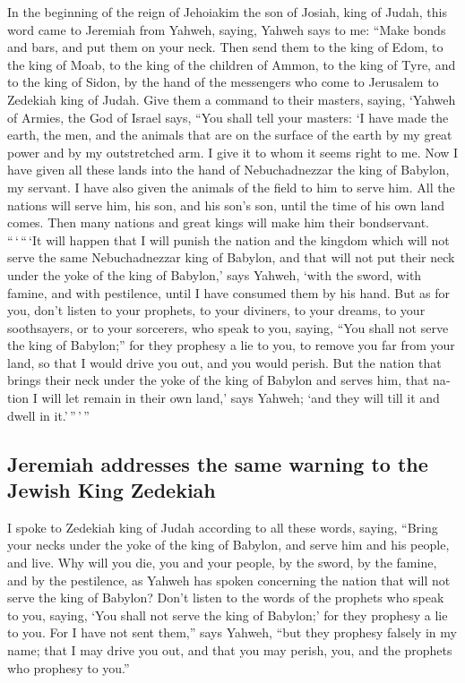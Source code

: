\begin{paracol}{2}
\begin{otherlanguage}{english}
 In the beginning of the reign of Jehoiakim the son of
Josiah, king of Judah, this word came to Jeremiah from Yahweh, saying,
 Yahweh says to me: ``Make bonds and bars, and put them on
your neck.  Then send them to the king of Edom, to the
king of Moab, to the king of the children of Ammon, to the king of Tyre,
and to the king of Sidon, by the hand of the messengers who come to
Jerusalem to Zedekiah king of Judah.  Give them a command
to their masters, saying, `Yahweh of Armies, the God of Israel says,
``You shall tell your masters:  `I have made the earth,
the men, and the animals that are on the surface of the earth by my
great power and by my outstretched arm. I give it to whom it seems right
to me.  Now I have given all these lands into the hand of
Nebuchadnezzar the king of Babylon, my servant. I have also given the
animals of the field to him to serve him.  All the nations
will serve him, his son, and his son's son, until the time of his own
land comes. Then many nations and great kings will make him their
bondservant.  ``\,`\,``\,`It will happen that I will
punish the nation and the kingdom which will not serve the same
Nebuchadnezzar king of Babylon, and that will not put their neck under
the yoke of the king of Babylon,' says Yahweh, `with the sword, with
famine, and with pestilence, until I have consumed them by his hand.
 But as for you, don't listen to your prophets, to your
diviners, to your dreams, to your soothsayers, or to your sorcerers, who
speak to you, saying, ``You shall not serve the king of Babylon;''
 for they prophesy a lie to you, to remove you far from
your land, so that I would drive you out, and you would perish.
 But the nation that brings their neck under the yoke of
the king of Babylon and serves him, that nation I will let remain in
their own land,' says Yahweh; `and they will till it and dwell in
it.'\,''\,'\,''

\hypertarget{jeremiah-addresses-the-same-warning-to-the-jewish-king-zedekiah}{%
\subsection{Jeremiah addresses the same warning to the Jewish King
Zedekiah}\label{jeremiah-addresses-the-same-warning-to-the-jewish-king-zedekiah}}

 I spoke to Zedekiah king of Judah according to all these
words, saying, ``Bring your necks under the yoke of the king of Babylon,
and serve him and his people, and live.  Why will you
die, you and your people, by the sword, by the famine, and by the
pestilence, as Yahweh has spoken concerning the nation that will not
serve the king of Babylon?  Don't listen to the words of
the prophets who speak to you, saying, `You shall not serve the king of
Babylon;' for they prophesy a lie to you.  For I have not
sent them,'' says Yahweh, ``but they prophesy falsely in my name; that I
may drive you out, and that you may perish, you, and the prophets who
prophesy to you.''


\end{otherlanguage}
\end{paracol}
